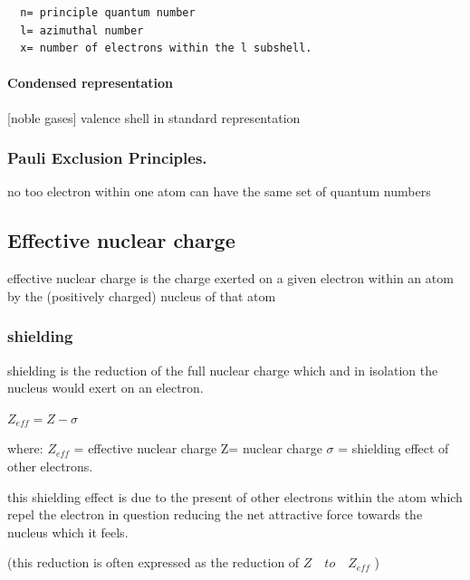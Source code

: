 \documentclass[]{article}
\let\oldparagraph\paragraph
\renewcommand{\paragraph}[1]{\oldparagraph{#1}\mbox{}}
\begin{document}
\begin{verbatim}
  n= principle quantum number
  l= azimuthal number
  x= number of electrons within the l subshell.      
\end{verbatim}

\hypertarget{condensed-representation}{%
\paragraph{Condensed representation}\label{condensed-representation}}

{[}noble gases{]} valence shell in standard representation

\hypertarget{pauli-exclusion-principles.}{%
\subsubsection{Pauli Exclusion
Principles.}\label{pauli-exclusion-principles.}}

no too electron within one atom can have the same set of quantum numbers

\hypertarget{effective-nuclear-charge}{%
\subsection{Effective nuclear charge}\label{effective-nuclear-charge}}

effective nuclear charge is the charge exerted on a given electron
within an atom by the (positively charged) nucleus of that atom

\hypertarget{shielding}{%
\subsubsection{shielding}\label{shielding}}

shielding is the reduction of the full nuclear charge which and in
isolation the nucleus would exert on an electron.

\(Z_{eff} = Z - \sigma\quad\)

where: \(Z_{eff}\) = effective nuclear charge Z= nuclear charge
\(\sigma\) = shielding effect of other electrons.

this shielding effect is due to the present of other electrons within
the atom which repel the electron in question reducing the net
attractive force towards the nucleus which it feels.

(this reduction is often expressed as the reduction of
\(Z \quad to \quad Z_{eff}\) )
\end{document}
